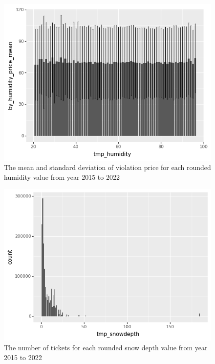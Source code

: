 \documentclass[12pt]{fphw}
\begin{document}
\begin{figure}[h!]
  \label{fig:month_hp}
  \includegraphics[width=1\textwidth]{figures2/Humidity_price.png}
  \caption{The mean and standard deviation of violation price for each rounded humidity value from year 2015 to 2022}
\end{figure}

\begin{figure}[h!]
  \label{fig:month_sc}
  \includegraphics[width=1\textwidth]{figures2/Snowdepth_count.png}
  \caption{The number of tickets for each rounded snow depth value from year 2015 to 2022}
\end{figure}
\end{document}
